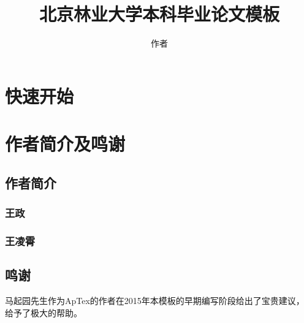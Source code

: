 \documentclass{bjfu}
\title{北京林业大学本科毕业论文模板}
\author{作者}
\begin{document}
\makeBjfuTitlePage
\section{快速开始}
\cite{刘海洋2013LATEX}

\section{作者简介及鸣谢}
\subsection{作者简介}
\subsubsection{王政}

\subsubsection{王凌霄}

\subsection{鸣谢}
马起园先生作为ApTex的作者在2015年本模板的早期编写阶段给出了宝贵建议， 给予了极大的帮助。


\end{document}
